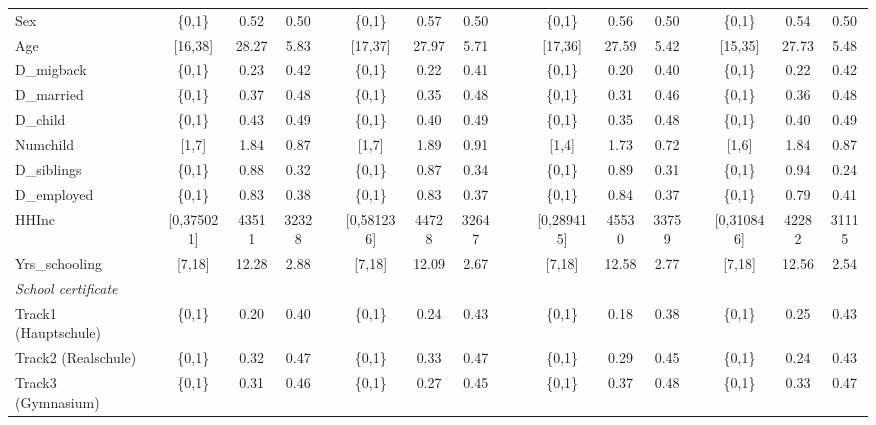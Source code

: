 \begin{center}
{\begin{longtable}{l*{17}{c}}
Sex & & \{0,1\} &0.52 &0.50 &  & \{0,1\} &0.57 &0.50 &  &  & \{0,1\} &0.56 &0.50 &  & \{0,1\} &0.54 &0.50 \\ 
Age & & [16,38] & 28.27 & 5.83 &  & [17,37] & 27.97 & 5.71 &  &  & [17,36] & 27.59 & 5.42 &  & [15,35] & 27.73  & 5.48 \\ 
D\_migback & & \{0,1\} &0.23 &0.42 &  & \{0,1\} &0.22 &0.41 &  &  & \{0,1\} &0.20 &0.40 &  & \{0,1\} &0.22 &0.42 \\ 
D\_married & & \{0,1\} &0.37 &0.48 &  & \{0,1\} &0.35 &0.48 &  &  & \{0,1\} &0.31 &0.46 &  & \{0,1\} &0.36 &0.48 \\ 
D\_child & & \{0,1\} &0.43 &0.49 &  & \{0,1\} &0.40 &0.49 &  &  & \{0,1\} &0.35 &0.48 &  & \{0,1\} &0.40 &0.49 \\ 
Numchild & & [1,7] & 1.84 &0.87 &  & [1,7] & 1.89 &0.91 &  &  & [1,4] & 1.73 &0.72 &  & [1,6] & 1.84 &0.87 \\ 
D\_siblings & & \{0,1\} &0.88 &0.32 &  & \{0,1\} &0.87 &0.34 &  &  & \{0,1\} &0.89 &0.31 &  & \{0,1\} &0.94 &0.24 \\ 
D\_employed & & \{0,1\} &0.83 &0.38 &  & \{0,1\} &0.83 &0.37 &  &  & \{0,1\} &0.84 &0.37 &  & \{0,1\} &0.79 &0.41 \\ 
HHInc & & [0,375021] & 43511 & 32328 &  & [0,581236] & 44728 & 32647 &  &  & [0,289415] & 45530 & 33759 &  & [0,310846] & 42282 & 31115 \\ 
Yrs\_schooling & & [7,18] & 12.28 & 2.88 &  & [7,18] & 12.09 & 2.67 &  &  & [7,18] & 12.58 & 2.77 &  & [7,18] & 12.56 & 2.54 \\ 
\textit{School certificate}\\
\quad \quad Track1 (Hauptschule) & & \{0,1\} &0.20 &0.40 &  & \{0,1\} &0.24 &0.43 &  &  & \{0,1\} &0.18 &0.38 &  & \{0,1\} &0.25 &0.43 \\ 
\quad \quad Track2 (Realschule) & & \{0,1\} &0.32 &0.47 &  & \{0,1\} &0.33 &0.47 &  &  & \{0,1\} &0.29 &0.45 &  & \{0,1\} &0.24 &0.43 \\ 
\quad \quad Track3 (Gymnasium) & & \{0,1\} &0.31 &0.46 &  & \{0,1\} &0.27 &0.45 &  &  & \{0,1\} &0.37 &0.48 &  & \{0,1\} &0.33 &0.47 \\ 

 




\end{longtable}}
\end{center}
